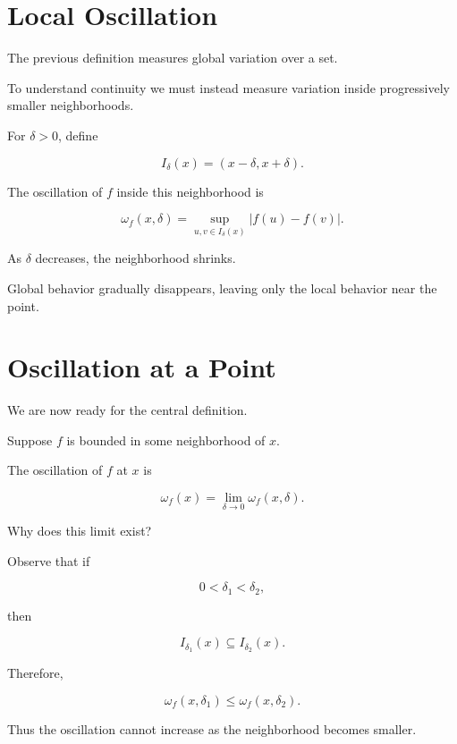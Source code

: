 \documentclass{essay}
\begin{document}

\section{Local Oscillation}

The previous definition measures global variation over a set.

To understand continuity we must instead measure variation inside
progressively smaller neighborhoods.

For \(\delta>0\), define

\[ I_{\delta}(x) = (x-\delta,x+\delta). \]

The oscillation of \(f\) inside this neighborhood is

\[ \omega_{f}(x,\delta) = \sup_{u,v\in I_{\delta}(x)} |f(u)-f(v)|. \]

As \(\delta\) decreases, the neighborhood shrinks.

Global behavior gradually disappears, leaving only the local behavior near the
point.


\section{Oscillation at a Point}

We are now ready for the central definition.

\begin{definition}

  Suppose \(f\) is bounded in some neighborhood of \(x\).

  The oscillation of \(f\) at \(x\) is

  \[ \omega_{f}(x) = \lim_{\delta\to0} \omega_{f}(x,\delta). \]

\end{definition}

Why does this limit exist?

Observe that if

\[ 0<\delta_{1}<\delta_{2}, \]

then

\[ I_{\delta_{1}}(x) \subseteq I_{\delta_{2}}(x). \]

Therefore,

\[ \omega_{f}(x,\delta_{1}) \le \omega_{f}(x,\delta_{2}). \]

Thus the oscillation cannot increase as the neighborhood becomes smaller.
\end{document}
